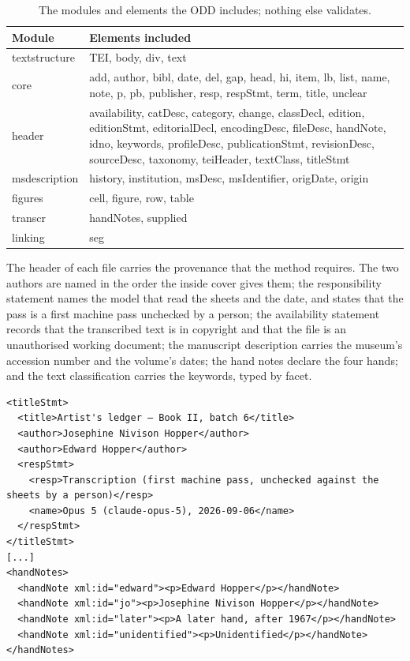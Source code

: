 \documentclass[11pt]{article}
\begin{document}
\begin{table}[htbp]\centering\small
\caption{The modules and elements the ODD includes; nothing else validates.}\label{tab:odd}
\begin{tabular}{lp{10cm}}\toprule
Module & Elements included\\\midrule
textstructure & TEI, body, div, text\\
core & add, author, bibl, date, del, gap, head, hi, item, lb, list, name, note, p, pb, publisher, resp, respStmt, term, title, unclear\\
header & availability, catDesc, category, change, classDecl, edition, editionStmt, editorialDecl, encodingDesc, fileDesc, handNote, idno, keywords, profileDesc, publicationStmt, revisionDesc, sourceDesc, taxonomy, teiHeader, textClass, titleStmt\\
msdescription & history, institution, msDesc, msIdentifier, origDate, origin\\
figures & cell, figure, row, table\\
transcr & handNotes, supplied\\
linking & seg\\\bottomrule
\end{tabular}
\end{table}

The header of each file carries the provenance that the method requires. The two authors are named in the order the inside cover gives them; the responsibility statement names the model that read the sheets and the date, and states that the pass is a first machine pass unchecked by a person; the availability statement records that the transcribed text is in copyright and that the file is an unauthorised working document; the manuscript description carries the museum's accession number and the volume's dates; the hand notes declare the four hands; and the text classification carries the keywords, typed by facet.

\begin{lstlisting}
<titleStmt>
  <title>Artist's ledger — Book II, batch 6</title>
  <author>Josephine Nivison Hopper</author>
  <author>Edward Hopper</author>
  <respStmt>
    <resp>Transcription (first machine pass, unchecked against the sheets by a person)</resp>
    <name>Opus 5 (claude-opus-5), 2026-09-06</name>
  </respStmt>
</titleStmt>
[...]
<handNotes>
  <handNote xml:id="edward"><p>Edward Hopper</p></handNote>
  <handNote xml:id="jo"><p>Josephine Nivison Hopper</p></handNote>
  <handNote xml:id="later"><p>A later hand, after 1967</p></handNote>
  <handNote xml:id="unidentified"><p>Unidentified</p></handNote>
</handNotes>
\end{lstlisting}
\end{document}
